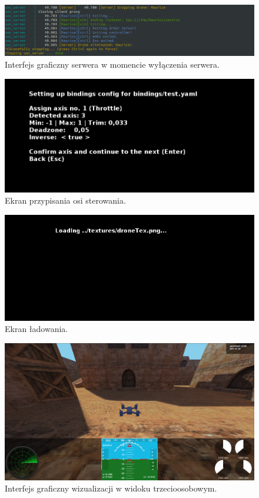 \documentclass[15pt]{sprawozdanie}
\begin{document}
\begin{figure}[!h]
	\centering
	\includegraphics[width=1\textwidth]{gui_server_exit.png}
	\caption{Interfejs graficzny serwera w momencie wyłączenia serwera.}
	\label{gui_server3}
\end{figure}
\begin{figure}[!h]
	\centering
	\includegraphics[width=1\textwidth]{bindings1.png}
	\caption{Ekran przypisania osi sterowania.}
	\label{gui_bindings1}
\end{figure}

\begin{figure}[!h]
	\centering
	\includegraphics[width=1\textwidth]{loading_screen.png}
	\caption{Ekran ładowania.}
	\label{gui_loading}
\end{figure}

\newpage
\begin{figure}[!h]
	\centering
	\includegraphics[width=1\textwidth]{game_view.png}
	\caption{Interfejs graficzny wizualizacji w widoku trzecioosobowym.}
	\label{gui_game1}
\end{figure}
\end{document}
